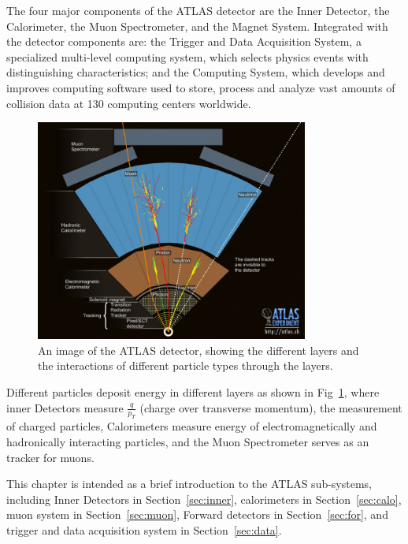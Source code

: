 \par The four major components of the ATLAS detector are the Inner Detector, the Calorimeter, the Muon Spectrometer, and the Magnet System. Integrated with the detector components are: the Trigger and Data Acquisition System, a specialized multi-level computing system, which selects physics events with distinguishing characteristics; and the Computing System, which develops and improves computing software used to store, process and analyze vast amounts of collision data at 130 computing centers worldwide\cite{atlas}.

\begin{figure}[htbp]
 \begin{center}
 \includegraphics[width=0.8\textwidth]{chapters/c4/figures/eve_gen.jpg}
 \end{center}
 \caption{An image of
the ATLAS detector, showing the
different layers and the interactions
of different particle types through
the layers.}
 \label{fig:eve-gen}
\end{figure}

\par Different particles deposit energy in different layers as shown in Fig~\ref{fig:eve-gen}, where inner Detectors measure $\frac{q}{p_T}$ (charge over transverse momentum), the measurement of charged particles, Calorimeters measure energy of electromagnetically and hadronically interacting particles, and the Muon Spectrometer serves as an tracker for muons.

\par This chapter is intended as a brief introduction to the ATLAS sub-systems, including Inner Detectors in Section~\ref{sec:inner}, calorimeters in Section~\ref{sec:calo}, muon system in Section~\ref{sec:muon}, Forward detectors in Section~\ref{sec:for}, and trigger and data acquisition system in Section~\ref{sec:data}.

